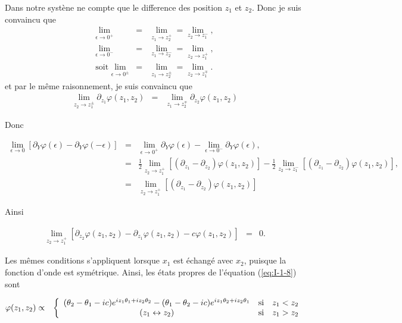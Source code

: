{\color{gray} 
Dans notre systène ne compte que le difference des position $z_1$ et $z_2$. Donc je suis convaincu que  
\begin{eqnarray*}
	\underset{ \epsilon \to 0^+ }{\lim}	&=& \underset{ z_1 \to z_2^+ }{\lim} = \underset{ z_2 \to z_1^- }{\lim},\\
	\underset{ \epsilon \to 0^- }{\lim}	&=& \underset{ z_1 \to z_2^- }{\lim} = \underset{ z_2 \to z_1^+ }{\lim},  \\
	\mbox{soit   } \underset{ \epsilon \to 0^\pm  }{\lim}	&=& \underset{ z_1 \to z_2^\pm  }{\lim} = \underset{ z_2 \to z_1^\mp  }{\lim}.
\end{eqnarray*}
et par le même raisonnement, je suis convaincu que
\begin{eqnarray*}
	\underset{ z_2 \to z_1^\pm  }{\lim}	\partial_{z_1} \varphi (z_1, z_2) & = & \underset{ z_1 \to z_2^\mp  }{\lim}	\partial_{z_2} \varphi (z_1, z_2)
\end{eqnarray*}

Donc 

\begin{eqnarray*}
	\underset{ \epsilon \to 0 }{\lim}  \left [ \partial_Y \varphi(\epsilon) - \partial_Y \varphi(-\epsilon) \right ] & = & 	\underset{ \epsilon \to 0^+ }{\lim}   \partial_Y \varphi(\epsilon) 	 - \underset{ \epsilon \to 0^- }{\lim}  \partial_Y \varphi(\epsilon),\\
	& = &  \frac{1}2 \underset{ z_2 \to z_1^+ }{\lim} \left [ \left ( \partial_{z_1} -\partial_{z_2} \right )\varphi ( z_1 , z_2 ) \right ] -  \frac{1}2 \underset{ z_2 \to z_1^- }{\lim} \left [ \left ( \partial_{z_1} -\partial_{z_2} \right )\varphi ( z_1 , z_2 ) \right ],\\
	& = & \underset{ z_2 \to z_1^+ }{\lim} \left [ \left ( \partial_{z_1} -\partial_{z_2} \right )\varphi ( z_1 , z_2 ) \right ]
\end{eqnarray*}

Ainsi 
}
\begin{eqnarray}
	\underset{ z_2 \to z_1^+ }{\lim}  \left [  \partial_{z_2}  \varphi ( z_1 , z_2 ) - \partial_{z_1}  \varphi ( z_1 , z_2 ) - c  \varphi ( z_1 , z_2 ) \right ] & = &0.  		
\end{eqnarray}

Les mêmes conditions s'appliquent lorsque $x_1$ est échangé avec $x_2$, puisque la fonction d'onde est symétrique. Ainsi, les états propres de l'équation (\ref{eq:I-1-8}) sont

\begin{eqnarray}\label{eq:I-1-10}
	\varphi(z_1 , z_2) & \propto &  \left \{ \begin{array} { c cl} ( \theta_2 - \theta_1 - ic) e^{ i z_1 \theta_1 + iz_2 \theta_2 } - ( \theta_1 - \theta_2 - ic) e^{ i z_1 \theta_2 + iz_2 \theta_1} & \mbox{si} & z_1 < z_2 \\ (z_1 \leftrightarrow z_2) & \mbox{si} & z_1 > z_2 \end{array} \right.
\end{eqnarray}

